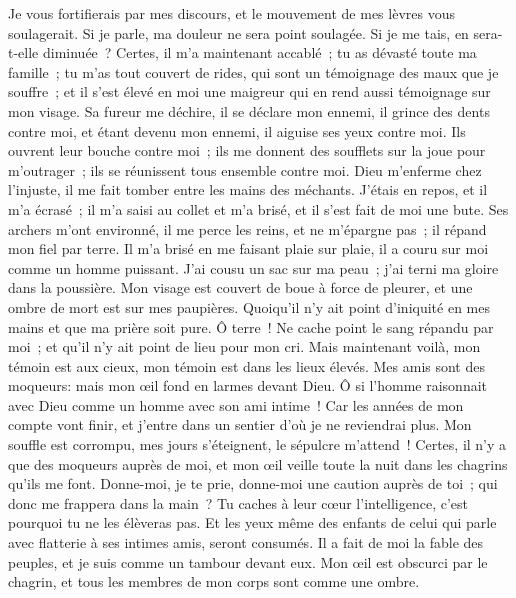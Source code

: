 \begin{multicols}{2}
Je vous fortifierais par mes discours, et le mouvement de mes lèvres vous soulagerait.
Si je parle, ma douleur ne sera point soulagée. Si je me tais, en sera-t-elle diminuée~?
Certes, il m'a maintenant accablé~; tu as dévasté toute ma famille~;
tu m'as tout couvert de rides, qui sont un témoignage des maux que je souffre~; et il s'est élevé en moi une maigreur qui en rend aussi témoignage sur mon visage.
Sa fureur me déchire, il se déclare mon ennemi, il grince des dents contre moi, et étant devenu mon ennemi, il aiguise ses yeux contre moi.
Ils ouvrent leur bouche contre moi~; ils me donnent des soufflets sur la joue pour m'outrager~; ils se réunissent tous ensemble contre moi.
Dieu m'enferme chez l'injuste, il me fait tomber entre les mains des méchants.
J'étais en repos, et il m'a écrasé~; il m'a saisi au collet et m'a brisé, et il s'est fait de moi une bute.
Ses archers m'ont environné, il me perce les reins, et ne m'épargne pas~; il répand mon fiel par terre.
Il m'a brisé en me faisant plaie sur plaie, il a couru sur moi comme un homme puissant.
J'ai cousu un sac sur ma peau~; j'ai terni ma gloire dans la poussière.
Mon visage est couvert de boue à force de pleurer, et une ombre de mort est sur mes paupières.
Quoiqu'il n'y ait point d'iniquité en mes mains et que ma prière soit pure.
Ô terre~! Ne cache point le sang répandu par moi~; et qu'il n'y ait point de lieu pour mon cri.
Mais maintenant voilà, mon témoin est aux cieux, mon témoin est dans les lieux élevés.
Mes amis sont des moqueurs: mais mon œil fond en larmes devant Dieu.
Ô si l'homme raisonnait avec Dieu comme un homme avec son ami intime~!
Car les années de mon compte vont finir, et j'entre dans un sentier d'où je ne reviendrai plus.
\VerseOne{}Mon souffle est corrompu, mes jours s'éteignent, le sépulcre m'attend~!
Certes, il n'y a que des moqueurs auprès de moi, et mon œil veille toute la nuit dans les chagrins qu'ils me font.
Donne-moi, je te prie, donne-moi une caution auprès de toi~; qui donc me frappera dans la main~?
Tu caches à leur cœur l'intelligence, c'est pourquoi tu ne les élèveras pas.
Et les yeux même des enfants de celui qui parle avec flatterie à ses intimes amis, seront consumés.
Il a fait de moi la fable des peuples, et je suis comme un tambour devant eux.
Mon œil est obscurci par le chagrin, et tous les membres de mon corps sont comme une ombre.

\end{multicols}
